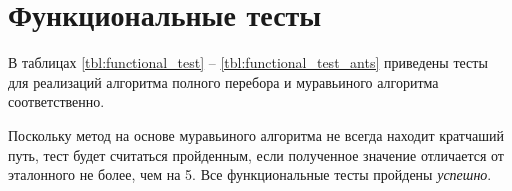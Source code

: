\clearpage



\clearpage







\clearpage



\clearpage

\section{Функциональные тесты}

В таблицах \ref{tbl:functional_test} -- \ref{tbl:functional_test_ants} приведены тесты для реализаций алгоритма полного перебора и муравьиного алгоритма соответственно.

Поскольку метод на основе муравьиного алгоритма не всегда находит кратчаший путь, тест будет считаться пройденным, если полученное значение отличается от эталонного не более, чем на 5.
Все функциональные тесты пройдены \textit{успешно}.


